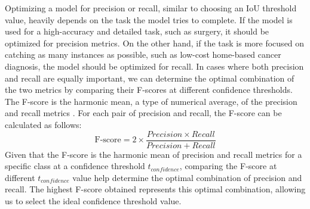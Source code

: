 Optimizing a model for precision or recall, similar to choosing an IoU threshold value, heavily depends on the task the model tries to complete. If the model is used for a high-accuracy and detailed task, such as surgery, it should be optimized for precision metrics. On the other hand, if the task is more focused on catching as many instances as possible, such as low-cost home-based cancer diagnosis, the model should be optimized for recall. In cases where both precision and recall are equally important, we can determine the optimal combination of the two metrics by comparing their F-scores at different confidence thresholds. The F-score is the harmonic mean, a type of numerical average, of the precision and recall metrics \cite{fscore_2017}. For each pair of precision and recall, the F-score can be calculated as follows:
\begin{equation}
    \text{F-score} = 2 \times \frac{Precision \times Recall}{Precision + Recall}
\end{equation}
Given that the F-score is the harmonic mean of precision and recall metrics for a specific class at a confidence threshold $t_{confidence}$, comparing the F-score at different $t_{confidence}$ value help determine the optimal combination of precision and recall. The highest F-score obtained represents this optimal combination, allowing us to select the ideal confidence threshold value.

